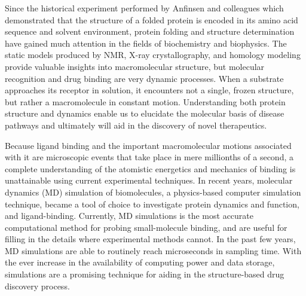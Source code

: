 Since the historical experiment performed by Anfinsen and colleagues which demonstrated that the structure of a folded protein is encoded in its amino acid sequence and solvent environment, protein folding and structure determination have gained much attention in the fields of biochemistry and biophysics. The static models produced by NMR, X-ray crystallography, and homology modeling provide valuable insights into macromolecular structure, but molecular recognition and drug binding are very dynamic processes. When a substrate approaches its receptor in solution, it encounters not a single, frozen structure, but rather a macromolecule in constant motion. Understanding both protein structure and dynamics enable us to elucidate the molecular basis of disease pathways and ultimately will aid in the discovery of novel therapeutics. 

Because ligand binding and the important macromolecular motions associated with it are microscopic events that take place in mere millionths of a second, a complete understanding of the atomistic energetics and mechanics of binding is unattainable using current experimental techniques. In recent years, molecular dynamics (MD) simulation of biomolecules, a physics-based computer simulation technique, became a tool of choice to investigate protein dynamics and function, and ligand-binding. Currently, MD simulations is the most accurate computational method for probing small-molecule binding, and are useful for filling in the details where experimental methods cannot.\cite{Durrant:2011bm} In the past few years, MD simulations are able to routinely reach microseconds in sampling time. With the ever increase in the availability of computing power and data storage, simulations are a promising technique for aiding in the structure-based drug discovery process. 

